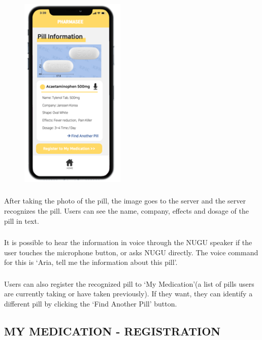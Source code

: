 \documentclass[conference]{IEEEtran}
\begin{document}
\begin{figure}[h!]
\centering
\includegraphics[width=5cm]{imagefolder/infodisplay.png}
\caption{}
\label{fig:map}
\end{figure}

\subsubsection{}After taking the photo of the pill, the image goes to the server and the server recognizes the pill. Users can see the name, company, effects and dosage of the pill in text.\\ 

\subsubsection{}It is possible to hear the information in voice through the NUGU speaker if the user touches the microphone button, or asks NUGU directly. The voice command for this is  ‘Aria, tell me the information about this pill’.\\

\subsubsection{}Users can also register the recognized pill to ‘My Medication’(a list of pills users are currently taking or have taken previously). If they want, they can identify a different pill by clicking the ‘Find Another Pill’ button.\\


\subsection{MY MEDICATION - REGISTRATION}\\
\end{document}
